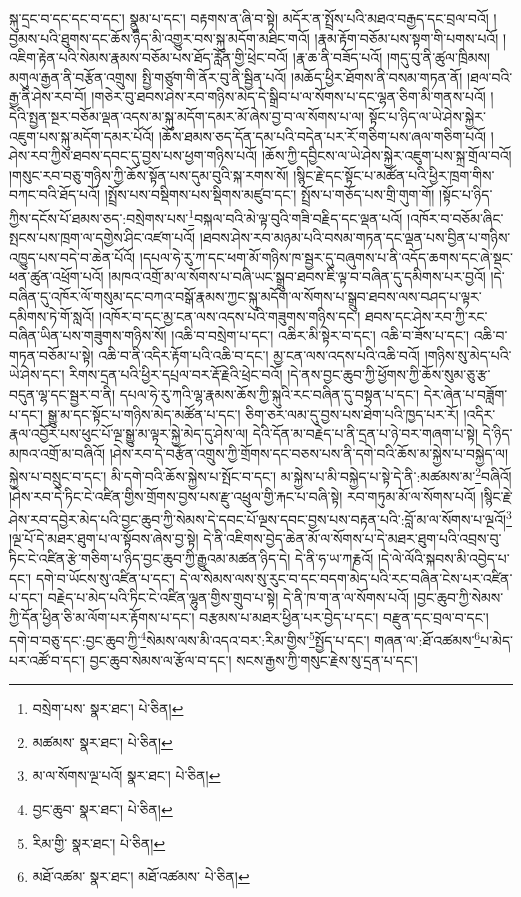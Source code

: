 སྐུ་དྲང་བ་དང་དང་བ་དང་། སྣུམ་པ་དང་། བརྟགས་ན་ཞི་བ་སྟེ། མདོར་ན་སྤྲོས་པའི་མཐའ་བརྒྱད་དང་བྲལ་བའོ། །བྱམས་པའི་ཐུགས་དང་ཆོས་ཉིད་མི་འགྱུར་བས་སྐུ་མདོག་མཐིང་གའོ། །རྣམ་རྟོག་བཅོམ་པས་སྟག་གི་པགས་པའོ། །འཇིག་རྟེན་པའི་སེམས་རྣམས་བཅོམ་པས་ཐོད་རློན་གྱི་ཕྲེང་བའོ། །རྣ་ཆ་ནི་བཟོད་པའོ། །གདུ་བུ་ནི་ཚུལ་ཁྲིམས། མགུལ་རྒྱན་ནི་བརྩོན་འགྲུས། སྤྱི་གཙུག་གི་ནོར་བུ་ནི་སྦྱིན་པའོ། །མཆོད་ཕྱིར་ཐོགས་ནི་བསམ་གཏན་ནོ། །ཐལ་བའི་རྒྱ་ནི་ཤེས་རབ་བོ། །གཅེར་བུ་ཐབས་ཤེས་རབ་གཉིས་མེད་དེ་སྒྲིབ་པ་ལ་སོགས་པ་དང་ལྷན་ཅིག་མི་གནས་པའོ། །དེའི་སྤྱན་སྔར་བཅོམ་ལྡན་འདས་མ་སྐུ་མདོག་དམར་མོ་ཞེས་བྱ་བ་ལ་སོགས་པ་ལ། སྟོང་པ་ཉིད་ལ་ཡེ་ཤེས་སྐྱེར་འཇུག་པས་སྐུ་མདོག་དམར་པོའོ། །ཆོས་ཐམས་ཅད་དོན་དམ་པའི་བདེན་པར་རོ་གཅིག་པས་ཞལ་གཅིག་པའོ། །ཤེས་རབ་ཀྱིས་ཐབས་དབང་དུ་བྱས་པས་ཕྱག་གཉིས་པའོ། །ཆོས་ཀྱི་དབྱིངས་ལ་ཡེ་ཤེས་སྐྱེར་འཇུག་པས་སྐྲ་གྲོལ་བའོ། །གསུང་རབ་བཅུ་གཉིས་ཀྱི་ཆོས་སྟོན་པས་དུམ་བུའི་སྐ་རགས་སོ། །སྙིང་རྗེ་དང་སྟོང་པ་མཚོན་པའི་ཕྱིར་ཁྲག་གིས་བཀང་བའི་ཐོད་པའོ། །སྤྲོས་པས་བསྡིགས་པས་སྡིགས་མཛུབ་དང་། སྤྲོས་པ་གཅོད་པས་གྲི་གུག་གོ། །སྟོང་པ་ཉིད་ཀྱིས་དངོས་པོ་ཐམས་ཅད་:བསྲེགས་པས་\footnote{བསྲེག་པས་  སྣར་ཐང་།  པེ་ཅིན། }བསྐལ་བའི་མེ་ལྟ་བུའི་གཟི་བརྗིད་དང་ལྡན་པའོ། །འཁོར་བ་བཅོམ་ཞིང་སྤངས་པས་ཁྲག་ལ་དགྱེས་ཤིང་འཛག་པའོ། །ཐབས་ཤེས་རབ་མཉམ་པའི་བསམ་གཏན་དང་ལྡན་པས་བྱིན་པ་གཉིས་འཁྱུད་པས་བདེ་བ་ཆེན་པོའོ། །དཔལ་ཧེ་རུ་ཀ་དང་ཕག་མོ་གཉིས་ཁ་སྦྱར་དུ་བཞུགས་པ་ནི་འདོད་ཆགས་དང་ཞེ་སྡང་ཕན་ཚུན་འཕྲོག་པའོ། །མཁའ་འགྲོ་མ་ལ་སོགས་པ་བཞི་ཡང་སྒྲུབ་ཐབས་ཇི་ལྟ་བ་བཞིན་དུ་དམིགས་པར་བྱའོ། །དེ་བཞིན་དུ་འཁོར་ལོ་གསུམ་དང་བཀའ་བསྒོ་རྣམས་ཀྱང་སྐུ་མདོག་ལ་སོགས་པ་སྒྲུབ་ཐབས་ལས་བཤད་པ་ལྟར་དམིགས་ཏེ་གོ་སླའོ། །འཁོར་བ་དང་མྱ་ངན་ལས་འདས་པའི་གཟུགས་གཉིས་དང་། ཐབས་དང་ཤེས་རབ་ཀྱི་རང་བཞིན་ཡིན་པས་གཟུགས་གཉིས་སོ། །འཆི་བ་བསྲེག་པ་དང་། འཆིར་མི་སྟེར་བ་དང་། འཆི་བ་ཟོས་པ་དང་། འཆི་བ་གཏན་བཅོམ་པ་སྟེ། འཆི་བ་ནི་འདིར་རྟོག་པའི་འཆི་བ་དང་། མྱ་ངན་ལས་འདས་པའི་འཆི་བའོ། །གཉིས་སུ་མེད་པའི་ཡེ་ཤེས་དང་། རིགས་དྲན་པའི་ཕྱིར་དཔྲལ་བར་རྡོ་རྗེའི་ཕྲེང་བའོ། །དེ་ནས་བྱང་ཆུབ་ཀྱི་ཕྱོགས་ཀྱི་ཆོས་སུམ་ཅུ་རྩ་བདུན་ལྷ་དང་སྦྱར་བ་ནི། དཔལ་ཧེ་རུ་ཀའི་ལྷ་རྣམས་ཆོས་ཀྱི་སྐུའི་རང་བཞིན་དུ་བསྟན་པ་དང་། དེར་ཞེན་པ་བཟློག་པ་དང་། སྒྱུ་མ་དང་སྟོང་པ་གཉིས་མེད་མཚོན་པ་དང་། ཅིག་ཅར་ལམ་དུ་བྱས་པས་ཐེག་པའི་ཁྱད་པར་རོ། །འདིར་རྣལ་འབྱོར་པས་ཕུང་པོ་ལྔ་སྒྱུ་མ་ལྟར་སྐྱེ་མེད་དུ་ཤེས་ལ། དེའི་དོན་མ་བརྗེད་པ་ནི་དྲན་པ་ཉེ་བར་གཞག་པ་སྟེ། དེ་ཉིད་མཁའ་འགྲོ་མ་བཞིའོ། །ཤེས་རབ་དེ་བརྩོན་འགྲུས་ཀྱི་གྲོགས་དང་བཅས་པས་ནི་དགེ་བའི་ཆོས་མ་སྐྱེས་པ་བསྐྱེད་ལ། སྐྱེས་པ་བསྲུང་བ་དང་། མི་དགེ་བའི་ཆོས་སྐྱེས་པ་སྤོང་བ་དང་། མ་སྐྱེས་པ་མི་བསྐྱེད་པ་སྟེ་དེ་ནི་:མཚམས་མ་\footnote{མཚམས་  སྣར་ཐང་།  པེ་ཅིན། }བཞིའོ། །ཤེས་རབ་དེ་ཏིང་ངེ་འཛིན་གྱིས་གྲོགས་བྱས་པས་རྫུ་འཕྲུལ་གྱི་རྐང་པ་བཞི་སྟེ། རབ་གཏུམ་མོ་ལ་སོགས་པའོ། །སྙིང་རྗེ་ཤེས་རབ་དབྱེར་མེད་པའི་བྱང་ཆུབ་ཀྱི་སེམས་དེ་དབང་པོ་ལྔས་དབང་བྱས་པས་བརྟན་པའི་:བློ་མ་ལ་སོགས་པ་ལྔའོ།\footnote{མ་ལ་སོགས་ལྔ་པའོ།  སྣར་ཐང་།  པེ་ཅིན། } །ལྔ་པོ་དེ་མཐར་ཐུག་པ་ལ་སྟོབས་ཞེས་བྱ་སྟེ། དེ་ནི་འཇིགས་བྱེད་ཆེན་མོ་ལ་སོགས་པ་དེ་མཐར་ཐུག་པའི་འབྲས་བུ་ཏིང་ངེ་འཛིན་རྩེ་གཅིག་པ་ཉིད་བྱང་ཆུབ་ཀྱི་རྒྱུའམ་མཚན་ཉིད་དེ། དེ་ནི་ཧ་ཡ་ཀརྞའོ། །དེ་ལེ་ལོའི་སྐབས་མི་འབྱེད་པ་དང་། དགེ་བ་ཡོངས་སུ་འཛིན་པ་དང་། དེ་ལ་སེམས་ལས་སུ་རུང་བ་དང་བདག་མེད་པའི་རང་བཞིན་ངེས་པར་འཛིན་པ་དང་། བརྗེད་པ་མེད་པའི་ཏིང་ངེ་འཛིན་ལྷུན་གྱིས་གྲུབ་པ་སྟེ། དེ་ནི་ཁ་ག་ན་ལ་སོགས་པའོ། །བྱང་ཆུབ་ཀྱི་སེམས་ཀྱི་དོན་ཕྱིན་ཅི་མ་ལོག་པར་རྟོགས་པ་དང་། བརྩམས་པ་མཐར་ཕྱིན་པར་བྱེད་པ་དང་། བརྫུན་དང་བྲལ་བ་དང་། དགེ་བ་བཅུ་དང་:བྱང་ཆུབ་ཀྱི་\footnote{བྱང་ཆུབ་  སྣར་ཐང་།  པེ་ཅིན། }སེམས་ལས་མི་འདའ་བར་:རིམ་གྱིས་\footnote{རིམ་གྱི་  སྣར་ཐང་།  པེ་ཅིན། }སྤྱོད་པ་དང་། གཞན་ལ་:ཐོ་འཚམས་\footnote{མཐོ་འཚམ་  སྣར་ཐང་། མཐོ་འཚམས་  པེ་ཅིན། }པ་མེད་པར་འཚོ་བ་དང་། བྱང་ཆུབ་སེམས་ལ་རྩོལ་བ་དང་། སངས་རྒྱས་ཀྱི་གསུང་རྗེས་སུ་དྲན་པ་དང་། 